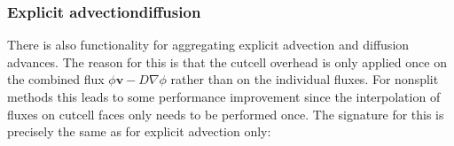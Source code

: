 \documentclass[letterpaper,10pt,english]{sphinxmanual}
\begin{document}
\begin{sphinxVerbatim}[commandchars=\\\{\},formatcom=\scriptsize]
 

    

         
    
          
                  
\end{sphinxVerbatim}


\subsubsection{Explicit advection\sphinxhyphen{}diffusion}
\label{\detokenize{Solvers/CDR:explicit-advection-diffusion}}\label{\detokenize{Solvers/CDR:chap-explicitadvectiondiffusion}}
\sphinxAtStartPar
There is also functionality for aggregating explicit advection and diffusion advances.
The reason for this is that the cut\sphinxhyphen{}cell overhead is only applied once on the combined flux \(\phi\mathbf{v} - D\nabla\phi\) rather than on the individual fluxes.
For non\sphinxhyphen{}split methods this leads to some performance improvement since the interpolation of fluxes on cut\sphinxhyphen{}cell faces only needs to be performed once.
The signature for this is precisely the same as for explicit advection only:

\begin{sphinxVerbatim}[commandchars=\\\{\},formatcom=\scriptsize]
        
\end{sphinxVerbatim}
\end{document}
